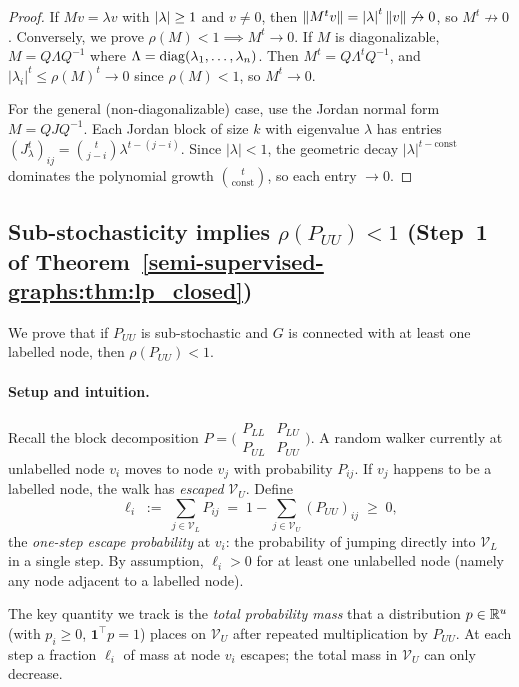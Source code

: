 \begin{notechapter}
\begin{proof}
If $Mv = \lambda v$ with $\left|\lambda\right|\geq1$ and $v\neq0$, then $\left\|M^tv\right\| = \left|\lambda\right|^t\left\|v\right\|\not\to0$,
so $M^t\not\to0$. Conversely, we prove $\rho(M) < 1 \implies M^t \to 0$. If $M$ is diagonalizable,
$M = Q\Lambda Q^{-1}$ where $\Lambda = \operatorname{diag}(\lambda_1, \ldots, \lambda_n)$.
Then $M^t = Q\Lambda^t Q^{-1}$, and $|\lambda_i|^t \leq \rho(M)^t \to 0$ since
$\rho(M) < 1$, so $M^t \to 0$.

For the general (non-diagonalizable) case, use the Jordan normal form
$M = QJQ^{-1}$. Each Jordan block of size $k$ with eigenvalue $\lambda$ has
entries $(J_\lambda^t)_{ij} = \binom{t}{j-i}\lambda^{t-(j-i)}$. Since
$|\lambda| < 1$, the geometric decay $|\lambda|^{t-\text{const}}$ dominates
the polynomial growth $\binom{t}{\text{const}}$, so each entry $\to 0$.
\end{proof}

\subsection{Sub-stochasticity implies $\rho(P_{UU})<1$ (Step~1 of
  Theorem~\ref{semi-supervised-graphs:thm:lp_closed})}
\label{semi-supervised-graphs:app:substochastic}

We prove that if $P_{UU}$ is sub-stochastic and $G$ is connected with at least
one labelled node, then $\rho(P_{UU}) < 1$.

\paragraph{Setup and intuition.}
Recall the block decomposition $P = \bigl(\begin{smallmatrix}P_{LL}&P_{LU}\\
P_{UL}&P_{UU}\end{smallmatrix}\bigr)$.  A random walker currently at unlabelled
node $v_i$ moves to node $v_j$ with probability $P_{ij}$.  If $v_j$ happens to
be a labelled node, the walk has \emph{escaped} $\mathcal{V}_U$.  Define
\[
  \ell_i \;:=\; \sum_{j \in \mathcal{V}_L} P_{ij}
  \;=\; 1 - \sum_{j \in \mathcal{V}_U}(P_{UU})_{ij} \;\geq\; 0,
\]
the \emph{one-step escape probability} at $v_i$: the probability of jumping
directly into $\mathcal{V}_L$ in a single step.  By assumption, $\ell_i > 0$
for at least one unlabelled node (namely any node adjacent to a labelled node).

The key quantity we track is the \emph{total probability mass} that a
distribution $p \in \mathbb{R}^u$ (with $p_i \geq 0$, $\mathbf{1}^\top p = 1$) places
on $\mathcal{V}_U$ after repeated multiplication by $P_{UU}$.  At each step a
fraction $\ell_i$ of mass at node $v_i$ escapes; the total mass in
$\mathcal{V}_U$ can only decrease.


\end{notechapter}
